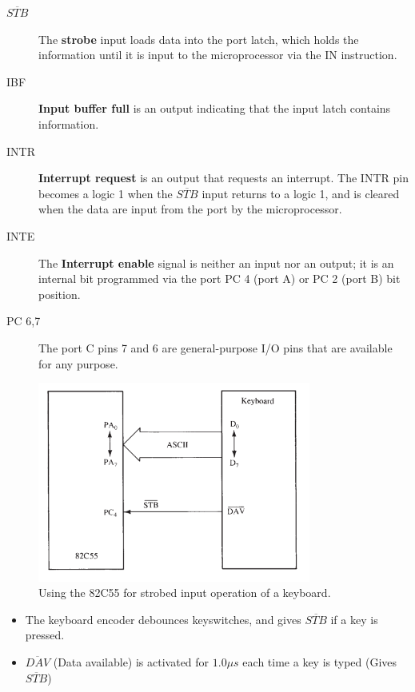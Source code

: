 \begin{description}
  \item[$\overline{STB}$] The \textbf{strobe} input loads data into the port latch, which holds the information until it is input to the microprocessor via the IN instruction.
  \item[IBF] \textbf{Input buffer full} is an output indicating that the input latch contains information.
  \item[INTR] \textbf{Interrupt request} is an output that requests an interrupt. The INTR pin becomes a logic 1 when the $\overline{STB}$ input returns to a logic 1, and is cleared when the data are input from the port by the microprocessor.
  \item[INTE] The \textbf{Interrupt enable} signal is neither an input nor an output; it is an internal bit programmed via the port PC 4 (port A) or PC 2 (port B) bit position.
  \item[PC 6,7] The port C pins 7 and 6 are general-purpose I/O pins that are available for any purpose.

\end{description}
\begin{figure}[h!]
  \centering
  \includegraphics[width = 0.8\textwidth]{./figures/Strobed.png}
  \caption{Using the 82C55 for strobed input operation of a keyboard.}
\end{figure}
\begin{itemize}
  \item The keyboard encoder debounces keyswitches, and gives $\overline{STB}$ if a key is pressed.
  \item $\overline{DAV}$ (Data available) is activated for $1.0 \mu s$ each time a key is typed (Gives $\overline{STB}$)
\end{itemize}


